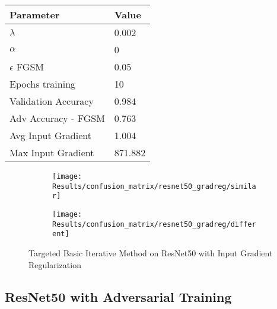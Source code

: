 \documentclass[draft,final]{vutinfth} %
\begin{document}
\begin{table}[h]
  \centering
  \begin{tabular}{ll}
    \toprule
			Parameter			& Value   \\
    \midrule
			$\lambda$								& 0.002				\\
			$\alpha$								& 0				\\
			$\epsilon$ FGSM					& 0.05		\\
			Epochs training					& 10			\\
			
			Validation Accuracy			& 0.984		\\ 
			Adv Accuracy - FGSM			& 0.763		\\
			
			Avg Input Gradient			& 1.004	\\
			Max Input Gradient			& 871.882\\
    \bottomrule
  \end{tabular}
\end{table}


\begin{figure}[h]
  \begin{subfigure}[b]{0.5\columnwidth}
		\centering
    \texttt{[image: Results/confusion\_matrix/resnet50\_gradreg/similar]}
    \label{fig:exp:cm:resnet50_gradreg:similar}
  \end{subfigure}
  \begin{subfigure}[b]{0.5\columnwidth}
		\centering
    \texttt{[image: Results/confusion\_matrix/resnet50\_gradreg/different]}
    \label{fig:exp:cm:resnet50_gradreg:different}
  \end{subfigure}
  \caption{Targeted Basic Iterative Method on ResNet50 with Input Gradient Regularization}
  \label{fig:exp:cm:resnet50_gradreg}
\end{figure}
\clearpage


\subsection{ResNet50 with Adversarial Training}
\end{document}
